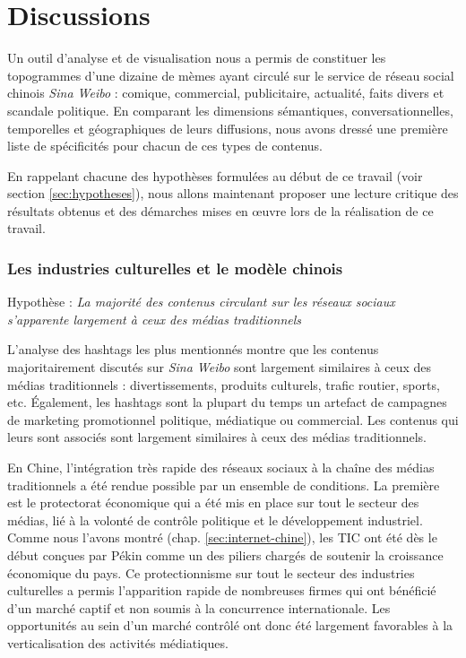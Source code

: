 \section[Discussions]{Discussions}



Un outil d{\textquoteright}analyse et de visualisation nous a permis de constituer les topogrammes d'une dizaine de mèmes ayant circulé sur le service de réseau social chinois \textit{Sina Weibo} : comique, commercial, publicitaire, actualité, faits divers et scandale politique.  En comparant les dimensions sémantiques, conversationnelles, temporelles et géographiques de leurs diffusions, nous avons dressé une première liste de spécificités pour chacun de ces types de contenus.

En rappelant chacune des hypothèses formulées au début de ce travail (voir section \ref{sec:hypotheses}), nous allons maintenant proposer une lecture critique des résultats obtenus et des démarches mises en œuvre lors de la réalisation de ce travail. 

\subsubsection{Les industries culturelles et le modèle chinois} 

Hypothèse : \textit{La majorité des contenus circulant sur les réseaux sociaux s'apparente largement à ceux des médias traditionnels} 

L{\textquoteright}analyse des hashtags les plus mentionnés montre que les contenus majoritairement discutés sur \textit{Sina Weibo} sont largement similaires à ceux des médias traditionnels : divertissements, produits culturels, trafic routier, sports, etc. \'Egalement, les hashtags sont la plupart du temps un artefact de campagnes de marketing promotionnel politique, médiatique ou commercial. Les contenus qui leurs sont associés sont largement similaires à ceux des médias traditionnels.

En Chine, l'intégration très rapide des réseaux sociaux à la chaîne des médias traditionnels a été rendue possible par un ensemble de conditions. La première est le protectorat économique qui a été mis en place sur tout le secteur des médias, lié à la volonté de contrôle politique et le développement industriel. Comme nous l'avons montré (chap. \ref{sec:internet-chine}), les TIC ont été dès le début conçues par Pékin comme un des piliers chargés de soutenir la croissance économique du pays. Ce protectionnisme sur tout le secteur des industries culturelles a permis l'apparition rapide de nombreuses firmes qui ont bénéficié d'un marché captif et non soumis à la concurrence internationale. Les opportunités au sein d'un marché contrôlé ont donc été largement favorables à la verticalisation des activités médiatiques.

